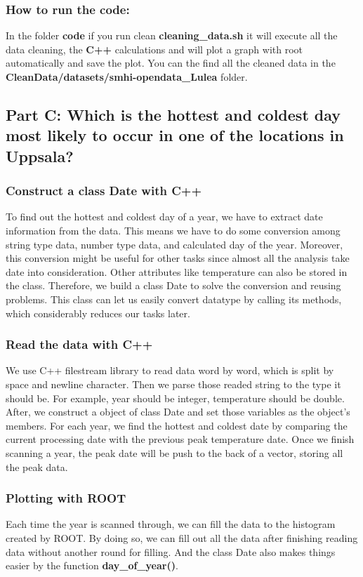 \documentclass[a4paper]{article}
\begin{document}
\subsubsection{How to run the code:}
In the folder \textbf{code} if you run clean \textbf{cleaning\_data.sh} it will execute all the data cleaning, the \textbf{C++} calculations and will plot a graph with root automatically and save the plot. You can the find all the cleaned data in the \textbf{CleanData/datasets/smhi-opendata\_Lulea} folder.

\subsection{Part C: Which is the hottest and coldest day most likely to occur in one of the locations in Uppsala?}
\subsubsection{Construct a class Date with C++}
To find out the hottest and coldest day of a year, we have to extract date information from the data. This means we have to do some conversion among string type data, number type data, and calculated day of the year. Moreover, this conversion might be useful for other tasks since almost all the analysis take date into consideration. Other attributes like temperature can also be stored in the class. Therefore, we build a class Date to solve the conversion and reusing problems. This class can let us easily convert datatype by calling its methods, which considerably reduces our tasks later.
\subsubsection{Read the data with C++}
We use C++ filestream library to read data word by word, which is split by space and newline character. Then we parse those readed string to the type it should be. For example, year should be integer, temperature should be double. After, we construct a object of class Date and set those variables as the object's members. For each year, we find the hottest and coldest date by comparing the current processing date with the previous peak temperature date.
Once we finish scanning a year, the peak date will be push to the back of a vector, storing all the peak data.
\subsubsection{Plotting with ROOT}
Each time the year is scanned through, we can fill the data to the histogram created by ROOT. By doing so, we can fill out all the data after finishing reading data without another round for filling. And the class Date also makes things easier by the function \textbf{day\_of\_year()}. 
\end{document}
